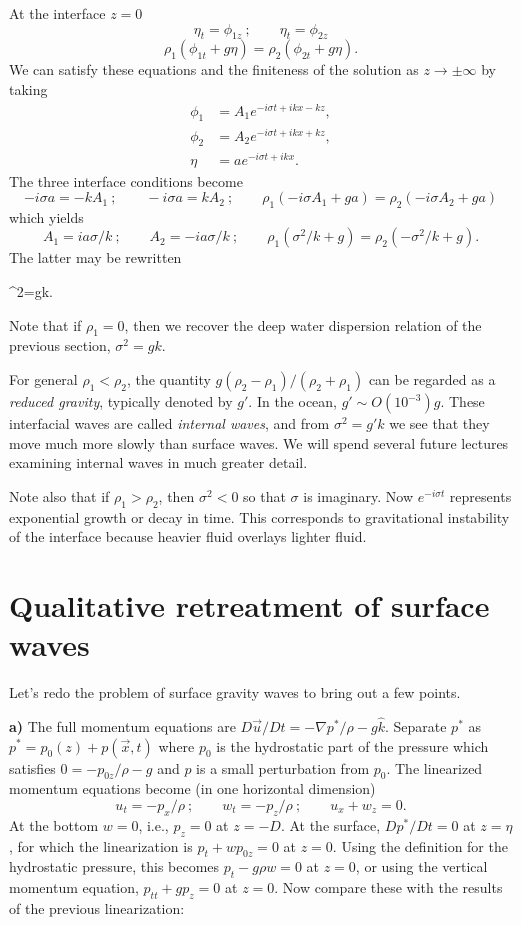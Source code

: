 At the interface $z=0$
\[
	\eta_t=\phi_{1z}\ ;\qquad \eta_t=\phi_{2z}
\]
\[
	\rho_1(\phi_{1t}+g\eta)=\rho_2(\phi_{2t}+g\eta).
\]
We can satisfy these equations and the finiteness of the solution as $z\to\pm\infty$ by taking
\begin{align*}
	\phi_1 & =A_1e^{-i\sigma t+ikx-kz}, \\
	\phi_2 & =A_2e^{-i\sigma t+ikx+kz}, \\
	\eta   & =ae^{-i\sigma t+ikx}.
\end{align*}
The three interface conditions become
\[
	-i\sigma a=-kA_1\ ;\qquad -i\sigma a=kA_2\ ;\qquad
	\rho_1(-i\sigma A_1+ga)=\rho_2(-i\sigma A_2+ga)
\]
which yields
\[
	A_1=i a\sigma/k\ ;\qquad A_2=-i a\sigma/k\ ;\qquad
	\rho_1(\sigma^2/k+g)=\rho_2(-\sigma^2/k+g).
\]
The latter may be rewritten
\begin{waveequation}
	\sigma^2=gk.
\end{waveequation}
Note that if $\rho_1=0$, then we recover the deep water dispersion relation of the previous
section, $\sigma^2=gk$.

\sourcepagebreak

For general $\rho_1<\rho_2$, the quantity $g(\rho_2-\rho_1)/(\rho_2+\rho_1)$ can be regarded as a
\emph{reduced gravity}, typically denoted by $g'$. In the ocean, $g'\sim O(10^{-3})g$. These interfacial
waves are called \emph{internal waves}, and from $\sigma^2=g'k$ we see that they move much more
slowly than surface waves. We will spend several future lectures examining internal
waves in much greater detail.

Note also that if $\rho_1>\rho_2$, then $\sigma^2<0$ so that $\sigma$ is imaginary. Now $e^{-i\sigma t}$
represents exponential growth or decay in time. This corresponds to gravitational
instability of the interface because heavier fluid overlays lighter fluid.

\section{Qualitative retreatment of surface waves}

Let's redo the problem of surface gravity waves to bring out a few points.

\textbf{a)} The full momentum equations are
$D\vec u/Dt=-\nabla p^*/\rho-g\hat k$. Separate $p^*$ as
$p^*=p_0(z)+p(\vec x,t)$ where $p_0$ is the hydrostatic part of the pressure which satisfies
$0=-p_{0z}/\rho-g$ and $p$ is a small perturbation from $p_0$. The linearized momentum
equations become (in one horizontal dimension)
\[
	u_t=-p_x/\rho\ ;\qquad w_t=-p_z/\rho\ ;\qquad u_x+w_z=0.
\]
At the bottom $w=0$, i.e., $p_z=0$ at $z=-D$. At the surface, $Dp^*/Dt=0$ at $z=\eta$, for
which the linearization is $p_t+wp_{0z}=0$ at $z=0$. Using the definition for the
hydrostatic pressure, this becomes $p_t-g\rho w=0$ at $z=0$, or using the vertical
momentum equation, $p_{tt}+gp_z=0$ at $z=0$. Now compare these with the results of the
previous linearization:

